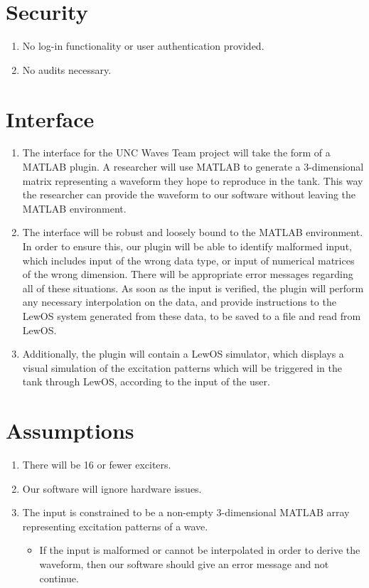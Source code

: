 \documentclass[12pt]{article}
\begin{document}
\section{Security}

\begin{enumerate}
\item No log-in functionality or user authentication provided.
\item No audits necessary.
\end{enumerate}

\section{Interface}

\begin{enumerate}
\item The interface for the UNC Waves Team project will take the form of a MATLAB plugin.  A researcher will use MATLAB to generate a 3-dimensional matrix representing a waveform they hope to reproduce in the tank.  This way the researcher can provide the waveform to our software without leaving the MATLAB environment. 
\item The interface will be robust and loosely bound to the MATLAB environment.  In order to ensure this, our plugin will be able to identify malformed input, which includes input of the wrong data type, or input of numerical matrices of the wrong dimension.  There will be appropriate error messages regarding all of these situations.  As soon as the input is verified, the plugin will perform any necessary interpolation on the data, and provide instructions to the LewOS system generated from these data, to be saved to a file and read from LewOS.
\item Additionally, the plugin will contain a LewOS simulator, which displays a visual simulation of the excitation patterns which will be triggered in the tank through LewOS, according to the input of the user.
\end{enumerate}

\section{Assumptions}

\begin{enumerate}
\item There will be 16 or fewer exciters.
\item Our software will ignore hardware issues.
\item The input is constrained to be a non-empty 3-dimensional MATLAB array representing excitation patterns of a wave.
  \begin{itemize}
	\item If the input is malformed or cannot be interpolated in order to derive the waveform, then our software should give an error message and not continue.
	\end{itemize}
\end{enumerate}
\end{document}
